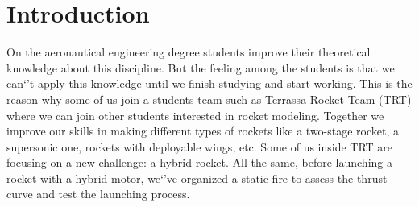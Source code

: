 
\section*{Introduction}

On the aeronautical engineering degree students improve their theoretical knowledge about this discipline. But the feeling among the students is that we can`’t apply this knowledge until we finish studying and start working. This is the reason why some of us join a students team such as Terrassa Rocket Team (TRT) where we can join other students interested in rocket modeling. Together we improve our skills in making different types of rockets like a two-stage rocket, a supersonic one, rockets with deployable wings, etc. Some of us inside TRT are focusing on a new challenge: a hybrid rocket.
All the same, before launching a rocket with a hybrid motor, we`'ve organized a static fire to assess the thrust curve and test the launching process.
